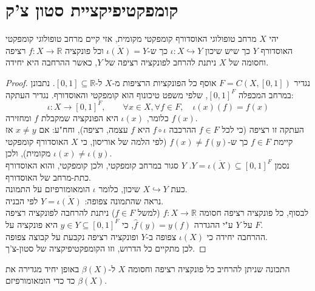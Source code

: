 \documentclass{tstextbook}
\begin{document}
\section{קומפקטיפיקציית סטון צ'ק}

\begin{theorem}[סטון צ'ק]
יהי \(X\) מרחב טופולוגי האוסדורף קומפקטי מקומית, אזי קיים מרחב טופולוגי קומפקטי האוסדורף \(Y\) כך שיש שיכון \(\iota:X\hookrightarrow Y\) כך ש-\(\overline{\iota(X)}=Y\) וכל פונקציה \(f:X\to \mathbb{R}\) רציפה וחסומה של \(X\) ניתנת להרחב לפונקציה רציפה של \(Y\), כאשר ההרחבה היא יחידה.

\end{theorem}
\begin{proof}
נגדיר \(F=C(X,[0,1])\) אוסף כל הפונקציות הרציפות מ-\(X\) ל-\([0,1]\subseteq \mathbb{R}\). נתבונן במרחב המכפלה \([0,1]^{F}\), שלפי משפט טיכונוף הוא קומפקטי והאוסדורף. נגדיר העתקה:
$$\iota :X\to[0,1]^{F},\qquad \forall x \in X, \forall f \in F,\quad \iota(x)(f)=f(x)$$
כלומר, \(\iota(x)\) היא הפונקציה שמקבלת \(f\) ומחזירה \(f(x)\).\\

העתקה זו רציפה (כי לכל \(f\in F\) ההרכבה \(f\circ \iota\) היא \(f\) עצמה, רציפה), וחח"ע: אם \(x\neq y\) אז קיימת \(f\in F\) כך ש-\(f(x)\neq f(y)\) (לפי הלמה של אוריסון, כי \(X\) האוסדורף קומפקטי מקומית), ולכן \(\iota(x)\neq \iota(y)\).\\

נסמן \(Y=\overline{\iota(X)}\subseteq [0,1]^F\). \(Y\) סגור במרחב קומפקטי, ולכן קומפקטי, והוא האוסדורף כתת-מרחב של האוסדורף.\\

כעת \(X\hookrightarrow Y\) שיכון, כלומר \(\iota\) הומאומורפיזם על התמונה.\\

נראה שהתמונה צפופה: \(Y=\overline{\iota(X)}\) לפי הבניה.\\

לבסוף, כל פונקציה רציפה חסומה \(f:X\to\mathbb{R}\) (למשל \(f\in F\)) ניתנת להרחבה לפונקציה רציפה על \(Y\) ע"י ההגדרה \(\hat{f}(y)=y(f)\), כי \(y\in Y\subseteq [0,1]^F\) היא פונקציה על \(F\).\\

ההרחבה יחידה כי \(\iota(X)\) צפופה ב-\(Y\) ופונקציה רציפה נקבעת על קבוצה צפופה.\\

לכן מתקיים כל הדרוש, וזו הקומפקטיפיקציה של סטון-צ'ך.

\end{proof}
\begin{proposition}
התכונה שניתן להרחיב כל פונקציה רציפה וחסומה \(X\) ל-\(\beta(X)\) באופן יחיד מגדירה את \(\beta(X)\) כד כדי הומאומורפיזם.

\end{proposition}
\end{document}
